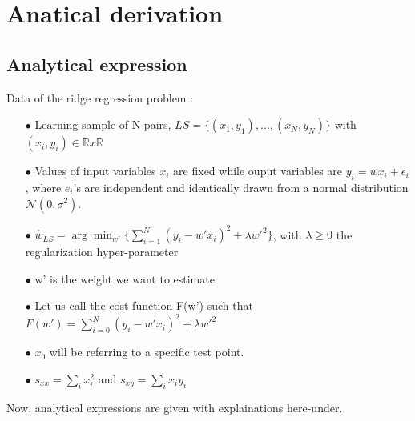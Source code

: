 \documentclass[12pt,titlepage]{article}
\begin{document}
\section{Anatical derivation}

\subsection{Analytical expression}

Data of the ridge regression problem :
\begin{enumerate}
    \item[$\bullet$] Learning sample of N pairs, $LS = \{(x_{1}, y_{1}), ..., (x_{N}, y_{N})\}$ with $(x_{i}, y_{i}) \in \mathbb{R} x \mathbb{R}$
    \item[$\bullet$] Values of input variables $x_{i}$ are fixed while ouput variables are $y_{i} = wx_{i} + \epsilon_{i}$, where $e_{i}$'s are independent and identically drawn from a normal distribution $\mathcal{N}(0, \sigma^{2})$.
    \item[$\bullet$] $\hat{w}_{LS} = \arg \min_{w'}\{\sum_{i=1}^{N}(y_{i}-w'x_{i})^{2}+\lambda w'^{2}\}$, with $\lambda \geq 0$ the regularization hyper-parameter
    \item[$\bullet$] w' is the weight we want to estimate
    \item[$\bullet$] Let us call the cost function F(w') such that $F(w') = \sum_{i=0}^{N} (y_{i}-w'x_{i})^{2} + \lambda w'^{2}$
    \item[$\bullet$] $x_{0}$ will be referring to a specific test point.
    \item[$\bullet$] $s_{xx} = \sum_{i}x_{i}^{2}$ and $s_{xy} = \sum_{i} x_{i}y_{i}$
\end{enumerate}
Now, analytical expressions are given with explainations here-under.
\end{document}
